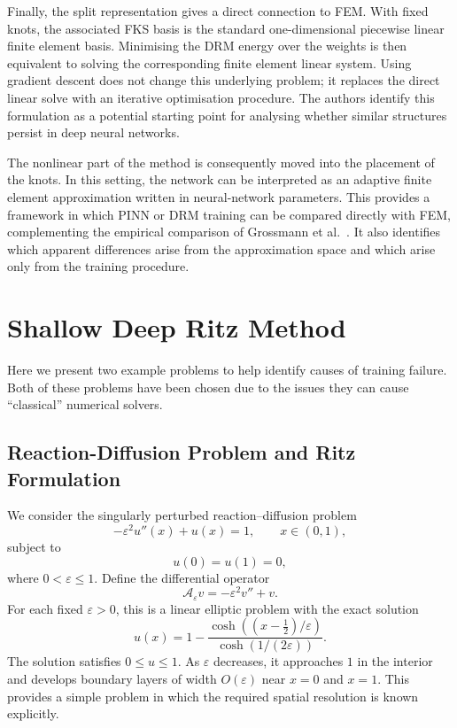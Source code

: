 \documentclass[11pt, onecolumn]{report}
\begin{document}
Finally, the split representation gives a direct connection to FEM. With fixed knots, the associated FKS basis is the standard one-dimensional piecewise linear finite element basis. Minimising the DRM energy over the weights is then equivalent to solving the corresponding finite element linear system. Using gradient descent does not change this underlying problem; it replaces the direct linear solve with an iterative optimisation procedure. The authors identify this formulation as a potential starting point for analysing whether similar structures persist in deep neural networks.

The nonlinear part of the method is consequently moved into the placement of the knots. In this setting, the network can be interpreted as an adaptive finite element approximation written in neural-network parameters. This provides a framework in which PINN or DRM training can be compared directly with FEM, complementing the empirical comparison of Grossmann et al.\ \cite{Grossmann_PINNFEM}. It also identifies which apparent differences arise from the approximation space and which arise only from the training procedure.


\section{Shallow Deep Ritz Method}
Here we present two example problems to help identify causes of training failure. Both of these problems have been chosen due to the issues they can cause ``classical'' numerical solvers. 

\subsection{Reaction-Diffusion Problem and Ritz Formulation}
\label{sec:EllipticProblem}

We consider the singularly perturbed reaction--diffusion problem
\begin{equation}
    -\varepsilon^2 u''(x)+u(x)=1,
    \qquad x\in(0,1),
    \label{eq:toy_problem}
\end{equation}
subject to
\begin{equation*}
    u(0)=u(1)=0,
\end{equation*}
where \(0<\varepsilon\leq 1\). Define the differential operator
\begin{equation*}
    \mathcal A_\varepsilon v
    =
    -\varepsilon^2v''+v.
\end{equation*}
For each fixed \(\varepsilon>0\), this is a linear elliptic problem with the exact solution
\begin{equation}
    u(x)
    =
    1-
    \frac{\cosh\left((x-\frac12)/\varepsilon\right)}
         {\cosh\left(1/(2\varepsilon)\right)}.
    \label{eq:toy_exact_solution}
\end{equation}
The solution satisfies \(0\leq u\leq1\). As \(\varepsilon\) decreases, it approaches \(1\) in the interior and develops boundary layers of width \(O(\varepsilon)\) near \(x=0\) and \(x=1\). This provides a simple problem in which the required spatial resolution is known explicitly.
\end{document}
